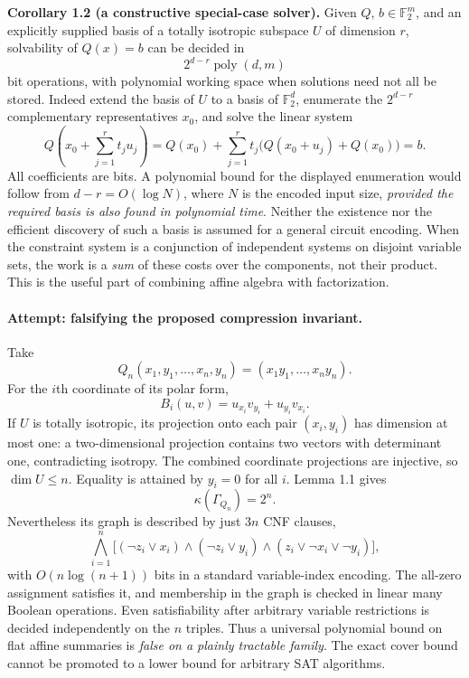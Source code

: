 \documentclass[11pt]{article}
\newcommand{\F}{\mathbb{F}}
\begin{document}
\medskip
\textbf{Corollary 1.2 (a constructive special-case solver).}
Given $Q$, $b\in\F_2^m$, and an explicitly supplied basis of a totally isotropic
subspace $U$ of dimension $r$, solvability of $Q(x)=b$ can be decided in
\begin{equation}\label{ra:statement:algorithm}
             2^{d-r}\operatorname{poly}(d,m)
\end{equation}
bit operations, with polynomial working space when solutions need not all be
stored. Indeed extend the basis of $U$ to a basis of $\F_2^d$, enumerate the
$2^{d-r}$ complementary representatives $x_0$, and solve the linear system
\[
 Q\!\left(x_0+\sum_{j=1}^r t_ju_j\right)
   =Q(x_0)+\sum_{j=1}^r t_j\bigl(Q(x_0+u_j)+Q(x_0)\bigr)=b.
\]
All coefficients are bits. A polynomial bound for the displayed enumeration
would follow from $d-r=O(\log N)$, where $N$ is the encoded input size,
\emph{provided the required basis is also found in polynomial time}. Neither
the existence nor the efficient discovery of such a basis is assumed for a
general circuit encoding. When the constraint system is a conjunction of
independent systems on disjoint variable sets, the work is a \emph{sum} of
these costs over the components, not their product. This is the useful part
of combining affine algebra with factorization.

\paragraph{Attempt: falsifying the proposed compression invariant.}
Take
\[
 Q_n(x_1,y_1,\ldots,x_n,y_n)=(x_1y_1,\ldots,x_ny_n).
\]
For the $i$th coordinate of its polar form,
\[
 B_i(u,v)=u_{x_i}v_{y_i}+u_{y_i}v_{x_i}.
\]
If $U$ is totally isotropic, its projection onto each pair $(x_i,y_i)$ has
dimension at most one: a two-dimensional projection contains two vectors
with determinant one, contradicting isotropy. The combined coordinate
projections are injective, so $\dim U\le n$. Equality is attained by $y_i=0$
for all $i$. Lemma 1.1 gives
\begin{equation}\label{ra:statement:andcover}
                        \kappa(\Gamma_{Q_n})=2^n.
\end{equation}
Nevertheless its graph is described by just $3n$ CNF clauses,
\[
 \bigwedge_{i=1}^n
  \bigl[(\neg z_i\vee x_i)\wedge(\neg z_i\vee y_i)
        \wedge(z_i\vee\neg x_i\vee\neg y_i)\bigr],
\]
with $O(n\log(n+1))$ bits in a standard variable-index encoding. The all-zero
assignment satisfies it, and membership in the graph is checked in linear
many Boolean operations. Even satisfiability after arbitrary variable
restrictions is decided independently on the $n$ triples. Thus a universal
polynomial bound on flat affine summaries is \emph{false on a plainly
tractable family}. The exact cover bound cannot be promoted to a lower bound
for arbitrary SAT algorithms.
\end{document}
